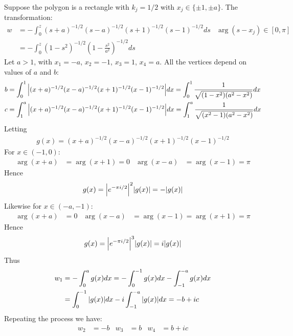 \documentclass[12pt, english]{book}
\begin{document}
	\begin{example}
		Suppose the polygon is a rectangle with \(k_j = 1/2\) with \(x_j \in \{\pm 1, \pm a\}\). The transformation:
		\begin{align*}
			w 
			&= - \int_{0}^{z} (s+a)^{-1/2} (s-a)^{-1/2} (s+1)^{-1/2} (s-1)^{-1/2} ds &
				\arg(s - x_j) \in [0, \pi] \\
			&= - \int_{0}^{z} (1-s^2)^{-1/2} \left(1- \frac{s^2}{a^2}\right)^{-1/2} ds
		\end{align*}
		Let \(a > 1\), with \(x_1 = -a\), \(x_2 = -1\), \(x_3 = 1\), \(x_4 = a\). All the vertices depend on values of \(a\) and \(b\):
		\begin{align*}
			b 
			&= \int_{0}^{1} \abs{(x+a)^{-1/2} (x-a)^{-1/2} (x+1)^{-1/2} (x-1)^{-1/2}} dx
			 = \int_{0}^{1} \frac{1}{\sqrt{(1-x^2)(a^2 - x^2)}} dx \\
			c 
			&= \int_{1}^{a} \abs{(x+a)^{-1/2} (x-a)^{-1/2} (x+1)^{-1/2} (x-1)^{-1/2}} dx
			= \int_{1}^{a} \frac{1}{\sqrt{(x^2-1)(a^2 - x^2)}} dx 
		\end{align*}
		Letting 
		\begin{align*}
			g(x) = (x+a)^{-1/2} (x-a)^{-1/2} (x+1)^{-1/2} (x-1)^{-1/2}
		\end{align*}
		For \(x \in (-1, 0)\):
		\begin{align*}
			\arg(x+a) &= \arg(x+1) = 0 &
			\arg(x-a) &= \arg(x-1) = \pi
		\end{align*}
		Hence
		\begin{align*}
			g(x) = \abs{e^{-\pi i /2}}^2 \abs{g(x)} = - \abs{g(x)}
		\end{align*}
		Likewise for \(x \in (-a, -1)\):
		{\color{Grey}
		\begin{align*}
			\arg(x+a) &= 0 &
			\arg(x-a) &= \arg(x-1) = \arg(x+1) = \pi
		\end{align*}}
		Hence
		\begin{align*}
			g(x) = \abs{e^{-\pi i /2}}^3 \abs{g(x)} = i \abs{g(x)}
		\end{align*}
		Thus
		\begin{align*}
			w_1 
			&= - \int_{0}^{a} g(x) dx = -\int_{0}^{-1} g(x)dx - \int_{-1}^{-a} g(x) dx \\
			&= \int_{0}^{-1} \abs{g(x)} dx - i \int_{-1}^{-a} \abs{g(x)} dx = -b + ic
		\end{align*}
		Repeating the process we have:
		\begin{align*}
			w_2 &= -b &
			w_3 &= b &
			w_4 &= b + ic
		\end{align*}
	\end{example}
	
\end{document}
